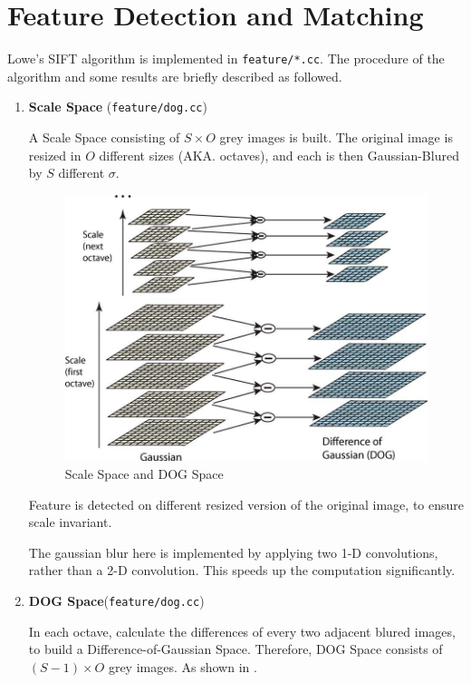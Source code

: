 
\section{Feature Detection and Matching}
Lowe's SIFT algorithm\cite{sift} is implemented in \verb|feature/*.cc|.
The procedure of the algorithm and some results are briefly described as followed.
\begin{enumerate}
  \item \textbf{Scale Space} (\verb|feature/dog.cc|)

    A Scale Space consisting of $ S \times O$ grey images is built.
    The original image is resized in $ O$ different sizes (AKA. octaves), and each is then Gaussian-Blured
    by $ S$ different $ \sigma$.
    \begin{figure}[H]
      \centering
      \includegraphics[scale=0.35]{res/dog.jpg}
      \caption{Scale Space and DOG Space \label{fig:dog}}
    \end{figure}

    Feature is detected on different resized version of the original
    image, to ensure scale invariant.

    The gaussian blur here is implemented by applying two 1-D convolutions, rather than
    a 2-D convolution. This speeds up the computation significantly.

  \item \textbf{DOG Space}(\verb|feature/dog.cc|)

    In each octave, calculate the differences of every two adjacent blured images, to build a Difference-of-Gaussian Space.
    Therefore, DOG Space consists of $ (S - 1) \times O$ grey images.
    As shown in .


\end{enumerate}
